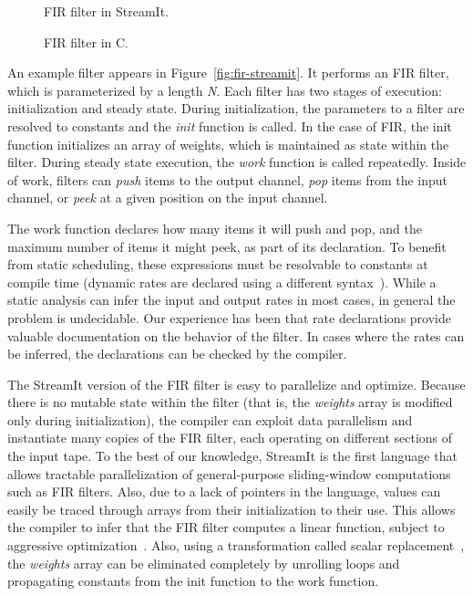 \begin{figure}[t]
\begin{minipage}{0.55\textwidth}
\end{minipage}
\begin{minipage}{0.45\textwidth}
\centering
\caption{FIR filter in StreamIt.\protect\label{fig:fir-streamit}}
\end{minipage}
\begin{minipage}{0.55\textwidth}
\centering
\caption{FIR filter in C.\protect\label{fig:fir-c}}
\end{minipage}
\end{figure}

An example filter appears in Figure~\ref{fig:fir-streamit}.  It
performs an FIR filter, which is parameterized by a length {\it N}.
Each filter has two stages of execution: initialization and steady
state.  During initialization, the parameters to a filter are resolved
to constants and the {\it init} function is called.  In the case of
FIR, the init function initializes an array of weights, which is
maintained as state within the filter.  During steady state execution,
the {\it work} function is called repeatedly.  Inside of work, filters
can {\it push} items to the output channel, {\it pop} items from the
input channel, or {\it peek} at a given position on the input channel.

The work function declares how many items it will push and pop, and
the maximum number of items it might peek, as part of its declaration.
To benefit from static scheduling, these expressions must be
resolvable to constants at compile time (dynamic rates are declared
using a different syntax~\cite{streamit-lang-spec}). While a static
analysis can infer the input and output rates in most cases, in
general the problem is undecidable.  Our experience has been that rate
declarations provide valuable documentation on the behavior of the
filter.  In cases where the rates can be inferred, the declarations
can be checked by the compiler.

The StreamIt version of the FIR filter is easy to parallelize and
optimize.  Because there is no mutable state within the filter (that
is, the {\it weights} array is modified only during initialization),
the compiler can exploit data parallelism and instantiate many copies
of the FIR filter, each operating on different sections of the input
tape.  To the best of our knowledge, StreamIt is the first language
that allows tractable parallelization of general-purpose
sliding-window computations such as FIR filters.  Also, due to a lack
of pointers in the language, values can easily be traced through
arrays from their initialization to their use.  This allows the
compiler to infer that the FIR filter computes a linear function,
subject to aggressive optimization~\cite{streamit-linear}.  Also,
using a transformation called scalar
replacement~\cite{sermulins:lctes:2005}, the {\it weights} array can
be eliminated completely by unrolling loops and propagating constants
from the init function to the work function.

